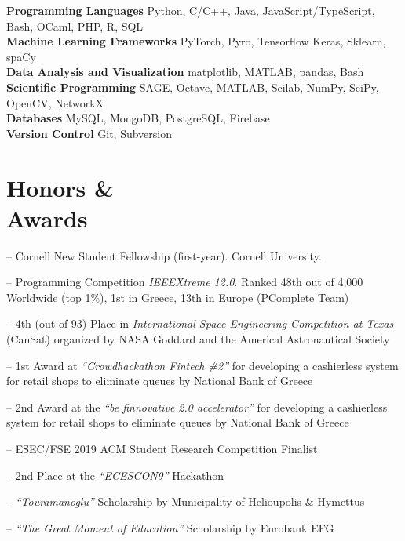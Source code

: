 \documentclass[margin, 10pt]{res}
\newcommand{\field}[2]{\noindent \textbf{#1} \hfill #2 \\}
\begin{document}
\begin{resume}
\field{Programming Languages}  {Python, C/C++, Java, JavaScript/TypeScript, Bash, OCaml, PHP, R, SQL  } 
\field{Machine Learning Frameworks}  {PyTorch, Pyro, Tensorflow Keras, Sklearn, spaCy } 
\field{Data Analysis and Visualization} {matplotlib, MATLAB, pandas, Bash } 
\field{Scientific Programming} {SAGE, Octave, MATLAB, Scilab, NumPy, SciPy, OpenCV, NetworkX} 
\field{Databases} {MySQL, MongoDB, PostgreSQL, Firebase}
\field{Version Control} {Git, Subversion}
\section{Honors \& \\ Awards} 
\begin{compactitem}
	\item[--] Cornell New Student Fellowship (first-year). Cornell University. 
    \item[--] Programming Competition \emph{IEEEXtreme 12.0}. Ranked 48th out of 4,000 Worldwide (top 1\%), 1st in Greece, 13th in Europe (PComplete Team)
    \item[--] 4th (out of 93) Place in \emph{International Space Engineering  Competition at Texas} (CanSat) organized by NASA Goddard and the Americal Astronautical Society
    \item[--] 1st Award at \emph{``Crowdhackathon Fintech \#2''} for developing a cashierless system for retail shops to eliminate queues by National Bank of Greece
    \item[--] 2nd Award at the \emph{``be finnovative 2.0 accelerator''} for developing a cashierless system for retail shops to eliminate queues by National Bank of Greece
    \item[--] ESEC/FSE 2019 ACM Student Research Competition Finalist
    \item[--] 2nd Place at the \emph{``ECESCON9''} Hackathon 
    \item [--] \emph{``Touramanoglu''} Scholarship by Municipality of Helioupolis \& Hymettus
    \item [--] \emph{``The Great Moment of Education''} Scholarship by Eurobank EFG 

\end{compactitem}



\end{resume}
\end{document}
